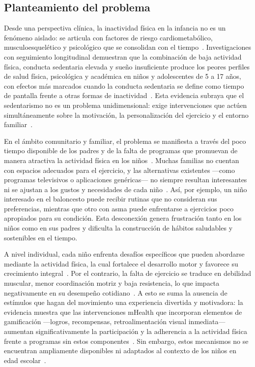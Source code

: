 			\subsection{Planteamiento del problema}
				Desde una perspectiva clínica, la inactividad física en la infancia no es un fenómeno aislado: se articula con factores de riesgo cardiometabólico, musculoesquelético y psicológico que se consolidan con el tiempo~\cite{Wilhite2023}. Investigaciones con seguimiento longitudinal demuestran que la combinación de baja actividad física, conducta sedentaria elevada y sueño insuficiente produce los peores perfiles de salud física, psicológica y académica en niños y adolescentes de 5 a 17 años, con efectos más marcados cuando la conducta sedentaria se define como tiempo de pantalla frente a otras formas de inactividad~\cite{Wilhite2023}. Esta evidencia subraya que el sedentarismo no es un problema unidimensional: exige intervenciones que actúen simultáneamente sobre la motivación, la personalización del ejercicio y el entorno familiar~\cite{Hesketh2017}.
				
				En el ámbito comunitario y familiar, el problema se manifiesta a través del poco tiempo disponible de los padres y de la falta de programas que promuevan de manera atractiva la actividad física en los niños~\cite{Hesketh2017}. Muchas familias no cuentan con espacios adecuados para el ejercicio, y las alternativas existentes ---como programas televisivos o aplicaciones genéricas--- no siempre resultan interesantes ni se ajustan a los gustos y necesidades de cada niño~\cite{VegaDiaz2023}. Así, por ejemplo, un niño interesado en el baloncesto puede recibir rutinas que no consideran sus preferencias, mientras que otro con asma puede enfrentarse a ejercicios poco apropiados para su condición. Esta desconexión genera frustración tanto en los niños como en sus padres y dificulta la construcción de hábitos saludables y sostenibles en el tiempo.
				
				A nivel individual, cada niño enfrenta desafíos específicos que pueden abordarse mediante la actividad física, la cual fortalece el desarrollo motor y favorece su crecimiento integral~\cite{Wilhite2023}. Por el contrario, la falta de ejercicio se traduce en debilidad muscular, menor coordinación motriz y baja resistencia, lo que impacta negativamente en su desempeño cotidiano~\cite{Musa2022}. A esto se suma la ausencia de estímulos que hagan del movimiento una experiencia divertida y motivadora: la evidencia muestra que las intervenciones mHealth que incorporan elementos de gamificación ---logros, recompensas, retroalimentación visual inmediata--- aumentan significativamente la participación y la adherencia a la actividad física frente a programas sin estos componentes~\cite{Xu2022}. Sin embargo, estos mecanismos no se encuentran ampliamente disponibles ni adaptados al contexto de los niños en edad escolar~\cite{Zhu2024}.
				

